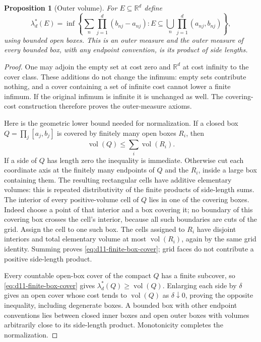 \documentclass[11pt,oneside,openany]{book}
\newtheorem{proposition}[theorem]{Proposition}
\theoremstyle{definition}
\theoremstyle{remark}
\newcommand{\R}{\mathbb R}\newcommand{\C}{\mathbb C}
\newcommand{\family}[1]{}
\begin{document}
\begin{proposition}[Outer volume]
\family{D11.03.lebesgue_outer}\label{d11:03:lebesgue-outer}
For $E\subseteq\R^d$ define
\[
 \lambda_d^*(E)=\inf\left\{\sum_n\prod_{j=1}^d(b_{nj}-a_{nj}):
 E\subseteq\bigcup_n\prod_{j=1}^d(a_{nj},b_{nj})\right\},
\]
using bounded open boxes. This is an outer measure and the outer measure of
every bounded box, with any endpoint convention, is its product of side lengths.
\end{proposition}
\begin{proof}
One may adjoin the empty set at cost zero and $\R^d$ at cost infinity to the
cover class. These additions do not change the infimum: empty sets contribute
nothing, and a cover containing a set of infinite cost cannot lower a finite
infimum. If the original infimum is infinite it is unchanged as well.
The covering-cost construction therefore proves the outer-measure axioms.

Here is the geometric lower bound needed for normalization. If a closed
box $Q=\prod_j[a_j,b_j]$ is covered by finitely many open boxes $R_i$, then
\begin{equation}\label{eq:d11-finite-box-cover}
 \operatorname{vol}(Q)\leq\sum_i\operatorname{vol}(R_i).
\end{equation}
If a side of $Q$ has length zero the inequality is immediate. Otherwise cut
each coordinate axis at the finitely many endpoints of $Q$ and the $R_i$,
inside a large box containing them. The resulting rectangular cells have
additive elementary volumes: this is repeated distributivity of the finite
products of side-length sums. The interior of every positive-volume cell of
$Q$ lies in one of the covering boxes. Indeed choose a point of that interior
and a box covering it; no boundary of this covering box crosses the cell's
interior, because all such boundaries are cuts of the grid. Assign the cell
to one such box. The cells assigned to $R_i$ have disjoint interiors and total
elementary volume at most $\operatorname{vol}(R_i)$, again by the same grid
identity. Summing proves \eqref{eq:d11-finite-box-cover}; grid faces do not
contribute a positive side-length product.

Every countable open-box cover of the compact $Q$ has a finite subcover,
so \eqref{eq:d11-finite-box-cover} gives
$\lambda_d^*(Q)\geq\operatorname{vol}(Q)$. Enlarging each side by $\delta$
gives an open cover whose cost tends to $\operatorname{vol}(Q)$ as
$\delta\downarrow0$, proving the opposite inequality, including degenerate
boxes. A bounded box with other endpoint conventions lies between closed
inner boxes and open outer boxes with volumes arbitrarily close to its
side-length product. Monotonicity completes the normalization.
\end{proof}
\end{document}
